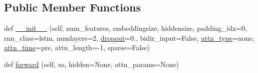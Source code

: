 \subsection*{Public Member Functions}
\begin{DoxyCompactItemize}
\item 
def \hyperlink{classparlai_1_1agents_1_1legacy__agents_1_1seq2seq_1_1modules__v1_1_1RNNDecoder_a83138d66aff992a0b8412d2d50906c78}{\+\_\+\+\_\+init\+\_\+\+\_\+} (self, num\+\_\+features, embeddingsize, hiddensize, padding\+\_\+idx=0, rnn\+\_\+class=\textquotesingle{}lstm\textquotesingle{}, numlayers=2, \hyperlink{classparlai_1_1agents_1_1legacy__agents_1_1seq2seq_1_1modules__v1_1_1RNNDecoder_aafa9ff93604c33107620e2286d31bc81}{dropout}=0., bidir\+\_\+input=False, \hyperlink{classparlai_1_1agents_1_1legacy__agents_1_1seq2seq_1_1modules__v1_1_1RNNDecoder_acbbf1a67ceb9dc480faabf0db0fadb3d}{attn\+\_\+type}=\textquotesingle{}none\textquotesingle{}, \hyperlink{classparlai_1_1agents_1_1legacy__agents_1_1seq2seq_1_1modules__v1_1_1RNNDecoder_a596b3a31dc03cd19485d86ad7be90981}{attn\+\_\+time}=\textquotesingle{}pre\textquotesingle{}, attn\+\_\+length=-\/1, sparse=False)
\item 
def \hyperlink{classparlai_1_1agents_1_1legacy__agents_1_1seq2seq_1_1modules__v1_1_1RNNDecoder_aa0fdddaf98d3385b432a9b52a0d1adbb}{forward} (self, xs, hidden=None, attn\+\_\+params=None)
\end{DoxyCompactItemize}
